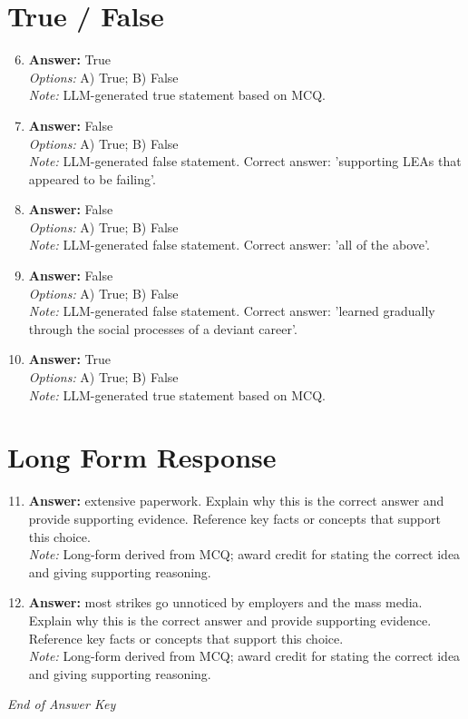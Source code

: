 \documentclass[12pt]{article}
\begin{document}
\section*{True / False}
\begin{enumerate}[label=\arabic*.]
\setcounter{enumi}{5}
\item \textbf{Answer:} True
\\ \textit{Options:} A) True; B) False
\\ \textit{Note:} LLM-generated true statement based on MCQ.
\item \textbf{Answer:} False
\\ \textit{Options:} A) True; B) False
\\ \textit{Note:} LLM-generated false statement. Correct answer: 'supporting LEAs that appeared to be failing'.
\item \textbf{Answer:} False
\\ \textit{Options:} A) True; B) False
\\ \textit{Note:} LLM-generated false statement. Correct answer: 'all of the above'.
\item \textbf{Answer:} False
\\ \textit{Options:} A) True; B) False
\\ \textit{Note:} LLM-generated false statement. Correct answer: 'learned gradually through the social processes of a deviant career'.
\item \textbf{Answer:} True
\\ \textit{Options:} A) True; B) False
\\ \textit{Note:} LLM-generated true statement based on MCQ.
\end{enumerate}

\section*{Long Form Response}
\begin{enumerate}[label=\arabic*.]
\setcounter{enumi}{10}
\item \textbf{Answer:} extensive paperwork. Explain why this is the correct answer and provide supporting evidence. Reference key facts or concepts that support this choice.
\\ \textit{Note:} Long-form derived from MCQ; award credit for stating the correct idea and giving supporting reasoning.
\item \textbf{Answer:} most strikes go unnoticed by employers and the mass media. Explain why this is the correct answer and provide supporting evidence. Reference key facts or concepts that support this choice.
\\ \textit{Note:} Long-form derived from MCQ; award credit for stating the correct idea and giving supporting reasoning.
\end{enumerate}

\vfill
\noindent\textit{End of Answer Key}
\end{document}
